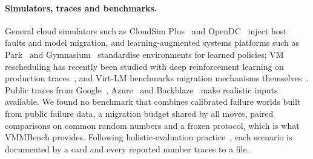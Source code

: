 \paragraph{Simulators, traces and benchmarks.}
General cloud simulators such as CloudSim Plus~\cite{cloudsimplus} and OpenDC~\cite{opendc} inject
host faults and model migration, and learning-augmented systems platforms such as
Park~\cite{mao2019park} and Gymnasium~\cite{towers2024gymnasium} standardise environments for
learned policies; VM rescheduling has recently been studied with deep reinforcement learning on
production traces~\cite{ding2025vm2rl}, and Virt-LM benchmarks migration mechanisms
themselves~\cite{huang2011virtlm}. Public traces from Google~\cite{tirmazi2020borg,googleclusterdata2019},
Azure~\cite{cortez2017resource,azurepublicdataset} and Backblaze~\cite{backblaze2026drivestats}
make realistic inputs available. We found no benchmark that combines calibrated failure worlds
built from public failure data, a migration budget shared by all moves, paired comparisons on
common random numbers and a frozen protocol, which is what VMMBench provides. Following
holistic-evaluation practice~\cite{liang2023helm}, each scenario is documented by a card and every
reported number traces to a file.
